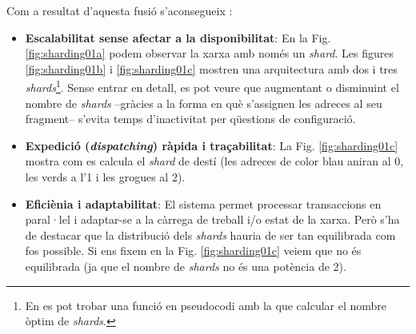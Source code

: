 \documentclass[11pt,a4paper]{article}
\begin{document}
Com a resultat d'aquesta fusió s'aconsegueix \cite{elrond2022}:
\begin{itemize}
	\item \textbf{Escalabilitat sense afectar a la disponibilitat}: En la Fig. \ref{fig:sharding01a} podem observar la xarxa amb només un \textit{shard}. Les figures \ref{fig:sharding01b} i \ref{fig:sharding01c} mostren una arquitectura amb dos i tres \textit{shards}\footnote{En \cite{elrond2019} es pot trobar una funció en pseudocodi amb la que calcular el nombre òptim de \textit{shards}.}. Sense entrar en detall, es pot veure que augmentant o disminuint el nombre de \textit{shards} –gràcies a la forma en què s'assignen les adreces al seu fragment– s'evita temps d'inactivitat per qüestions de configuració.
	\item \textbf{Expedició (\textit{dispatching}) ràpida i traçabilitat}: La Fig. \ref{fig:sharding01c} mostra com es calcula el \textit{shard} de destí (les adreces de color blau aniran al 0, les verds a l'1 i les grogues al 2).
	\item \textbf{Eficiènia i adaptabilitat}: El sistema permet processar transaccions en paral·lel i adaptar-se a la càrrega de treball i/o estat de la xarxa. Però s'ha de destacar que la distribució dels \textit{shards} hauria de ser tan equilibrada com fos possible. Si ens fixem en la Fig. \ref{fig:sharding01c} veiem que no és equilibrada (ja que el nombre de \textit{shards} no és una potència de 2).
\end{itemize}
\end{document}
